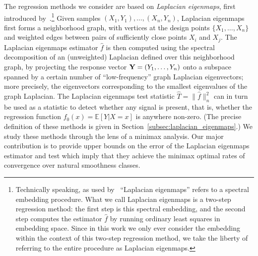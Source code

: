 \documentclass[aos]{imsart}
\theoremstyle{plain}
\theoremstyle{definition}
\theoremstyle{remark}
\newcommand{\wh}[1]{\widehat{#1}}
\newcommand{\1}{\mathbf{1}}
\begin{document}
The regression methods we consider are based on \emph{Laplacian eigenmaps}, first introduced by~\cite{belkin03a}.\footnote{Technically speaking, as used by~\cite{belkin03a} ``Laplacian eigenmaps'' refers to a spectral embedding procedure. What we call Laplacian eigenmaps is a two-step regression method: the first step is this spectral embedding, and the second step computes the estimator $\wh{f}$ by running ordinary least squares in embedding space.  Since in this work we only ever consider the embedding within the context of this two-step regression method, we take the liberty of referring to the entire procedure as Laplacian eigenmaps.} Given samples $(X_1,Y_1),\ldots,(X_n,Y_n)$, Laplacian eigenmaps first forms a neighborhood graph, with vertices at the design points $\{X_1,\ldots,X_n\}$ and weighted edges between pairs of sufficiently close points $X_i$ and $X_j$. The Laplacian eigenmaps estimator $\wh{f}$ is then computed using the spectral decomposition of an (unweighted) Laplacian defined over this neighborhood graph, by projecting the response vector ${\bf Y} = (Y_1,\ldots,Y_n)$ onto a subspace spanned by a certain number of ``low-frequency'' graph Laplacian eigenvectors; more precisely, the eigenvectors corresponding to the smallest eigenvalues of the graph Laplacian. The Laplacian eigenmaps test statistic $\wh{T} = \|\wh{f}\|_n^2$ can in turn be used as a statistic to detect whether any signal is present, that is, whether the regression function $f_0(x) = \mathbb{E}[Y|X = x]$ is anywhere non-zero. (The precise definition of these methods is given in Section~\ref{subsec:laplacian_eigenmaps}.) We study these methods through the lens of a minimax analysis. Our major contribution is to provide upper bounds on the error of the Laplacian eigenmaps estimator and test which imply that they achieve the minimax optimal rates of convergence over natural smoothness classes.
\end{document}
